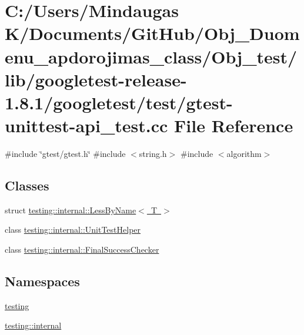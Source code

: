 \hypertarget{_obj__test_2lib_2googletest-release-1_88_81_2googletest_2test_2gtest-unittest-api__test_8cc}{}\section{C\+:/\+Users/\+Mindaugas K/\+Documents/\+Git\+Hub/\+Obj\+\_\+\+Duomenu\+\_\+apdorojimas\+\_\+class/\+Obj\+\_\+test/lib/googletest-\/release-\/1.8.1/googletest/test/gtest-\/unittest-\/api\+\_\+test.cc File Reference}
\label{_obj__test_2lib_2googletest-release-1_88_81_2googletest_2test_2gtest-unittest-api__test_8cc}
{\ttfamily \#include \char`\"{}gtest/gtest.\+h\char`\"{}}\newline
{\ttfamily \#include $<$string.\+h$>$}\newline
{\ttfamily \#include $<$algorithm$>$}\newline
\subsection*{Classes}
\begin{DoxyCompactItemize}
\item 
struct \mbox{\hyperlink{structtesting_1_1internal_1_1_less_by_name}{testing\+::internal\+::\+Less\+By\+Name$<$ T $>$}}
\item 
class \mbox{\hyperlink{classtesting_1_1internal_1_1_unit_test_helper}{testing\+::internal\+::\+Unit\+Test\+Helper}}
\item 
class \mbox{\hyperlink{classtesting_1_1internal_1_1_final_success_checker}{testing\+::internal\+::\+Final\+Success\+Checker}}
\end{DoxyCompactItemize}
\subsection*{Namespaces}
\begin{DoxyCompactItemize}
\item 
 \mbox{\hyperlink{namespacetesting}{testing}}
\item 
 \mbox{\hyperlink{namespacetesting_1_1internal}{testing\+::internal}}
\end{DoxyCompactItemize}
